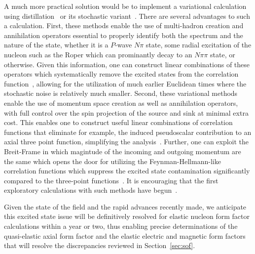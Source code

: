A much more practical solution would be to implement a variational calculation using distillation~\cite{HadronSpectrum:2009krc} or its stochastic variant~\cite{Morningstar:2011ka}.
There are several advantages to such a calculation.
First, these methods enable the use of multi-hadron creation and annihilation operators
  essential to properly identify both the spectrum and the nature of the state,
 whether it is a $P$-wave $N\pi$ state,
 some radial excitation of the nucleon such as the Roper
 which can prominantly decay to an $N\pi\pi$ state,
 or otherwise.
Given this information, one can construct linear combinations of these operators which systematically remove the excited states from the correlation function~\cite{Blossier:2009kd}, allowing for the utilization of much earlier Euclidean times where the stochastic noise is relatively much smaller.
Second, these variational methods enable the use of momentum space creation as well as annihilation operators, with full control over the spin projection of the source and sink at minimal extra cost.
This enables one to construct useful linear combinations of correlation functions that eliminate for example, the induced pseudoscalar contribution to an axial three point function, simplifying the analysis~\cite{Meyer:2017ddy}.
Further, one can exploit the Breit-Frame in which magintude of the incoming and outgoing momentum are the same which opens the door for utilizing the Feynman-Hellmann-like correlation functions which suppress the excited state contamination significantly compared to the three-point functions~\cite{He:2021yvm}.
It is encouraging that the first exploratory calculations with such methods have begun~\cite{Egerer:2018xgu,Barca:2021iak}.

Given the state of the field and the rapid advances recently made, we anticipate this excited state issue will be definitively resolved for elastic nucleon form factor calculations within a year or two, thus enabling precise determinations of the quasi-elastic axial form factor and the elastic electric and magnetic form factors that will resolve the discrepancies reviewed in Section~\ref{sec:sof}.


